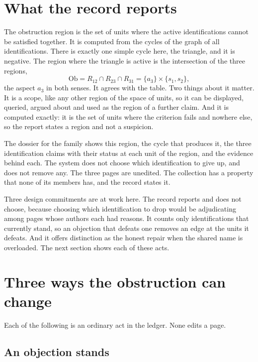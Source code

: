 \documentclass[11pt]{article}
\newcommand{\Ob}{\mathrm{Ob}}
\begin{document}
\section{What the record reports}\label{sec:report}

The obstruction region is the set of units where the active identifications cannot be satisfied together. It is computed from the cycles of the graph of all identifications. There is exactly one simple cycle here, the triangle, and it is negative. The region where the triangle is active is the intersection of the three regions,
\[
\Ob = R_{12}\cap R_{23}\cap R_{31} = \{a_3\}\times\{s_1,s_2\},
\]
the aspect $a_3$ in both senses. It agrees with the table. Two things about it matter. It is a scope, like any other region of the space of units, so it can be displayed, queried, argued about and used as the region of a further claim. And it is computed exactly: it is the set of units where the criterion fails and nowhere else, so the report states a region and not a suspicion.

The dossier for the family shows this region, the cycle that produces it, the three identification claims with their status at each unit of the region, and the evidence behind each. The system does not choose which identification to give up, and does not remove any. The three pages are unedited. The collection has a property that none of its members has, and the record states it.

Three design commitments are at work here. The record reports and does not choose, because choosing which identification to drop would be adjudicating among pages whose authors each had reasons. It counts only identifications that currently stand, so an objection that defeats one removes an edge at the units it defeats. And it offers distinction as the honest repair when the shared name is overloaded. The next section shows each of these acts.

\section{Three ways the obstruction can change}\label{sec:repairs}

Each of the following is an ordinary act in the ledger. None edits a page.

\subsection{An objection stands}
\end{document}

